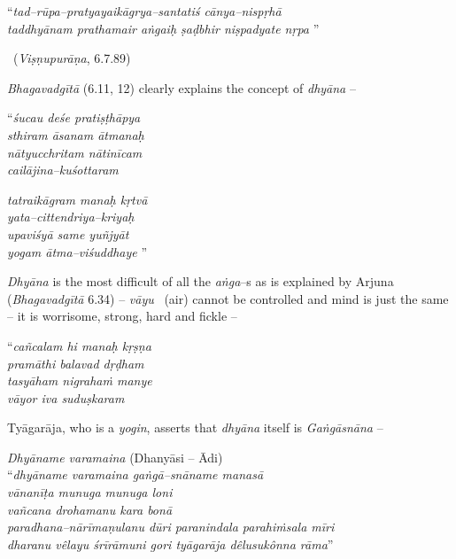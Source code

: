 \begin{myquote}
“\textit{tad–rūpa–pratyayaikāgrya–santatiś cānya–nispṛhā }\\\textit{taddhyānam prathamair aṅgaiḥ ṣaḍbhir niṣpadyate nṛpa} ” 

~\hfill (\textit{Viṣṇupurāṇa}, 6.7.89)
\end{myquote}

\textit{Bhagavadgītā} (6.11, 12) clearly explains the concept of \textit{dhyāna} –

\begin{myquote}
“\textit{śucau deśe pratiṣṭhāpya}\\\textit{sthiram āsanam ātmanaḥ }\\\textit{nātyucchritam nātinīcam}\\\textit{cailājina–kuśottaram }
\end{myquote}

\begin{myquote}
\textit{tatraikāgram manaḥ kṛtvā}\\\textit{yata–cittendriya–kriyaḥ }\\\textit{upaviśyā same yuñjyāt}\\\textit{yogam ātma–viśuddhaye} ”
\end{myquote}

\textit{Dhyāna} is the most difficult of all the \textit{aṅga}–s as is explained by Arjuna (\textit{Bhagavadgītā} 6.34) – \textit{vāyu}  (air) cannot be controlled and mind is just the same – it is worrisome, strong, hard and fickle –

\begin{myquote}
“\textit{cañcalam hi manaḥ kṛṣṇa}\\\textit{pramāthi balavad dṛḍham }\\\textit{tasyāham nigrahaṁ manye}\\\textit{vāyor iva suduṣkaram} 
\end{myquote}

Tyāgarāja, who is a \textit{yogin}, asserts that \textit{dhyāna} itself is \textit{Gaṅgāsnāna} –

\begin{myquote}
\textit{Dhyāname varamaina} (Dhanyāsi – Ādi)\\ “\textit{dhyāname varamaina gaṅgā–snāname manasā}\\\textit{vānanīṭa munuga munuga loni} \\\textit{vañcana drohamanu kara bonā}\\\textit{paradhana–nārīmaṇulanu dūri paranindala parahiṁsala mīri}\\\textit{dharanu vêlayu śrīrāmuni gori tyāgarāja dêlusukônna rāma}”
\end{myquote}

